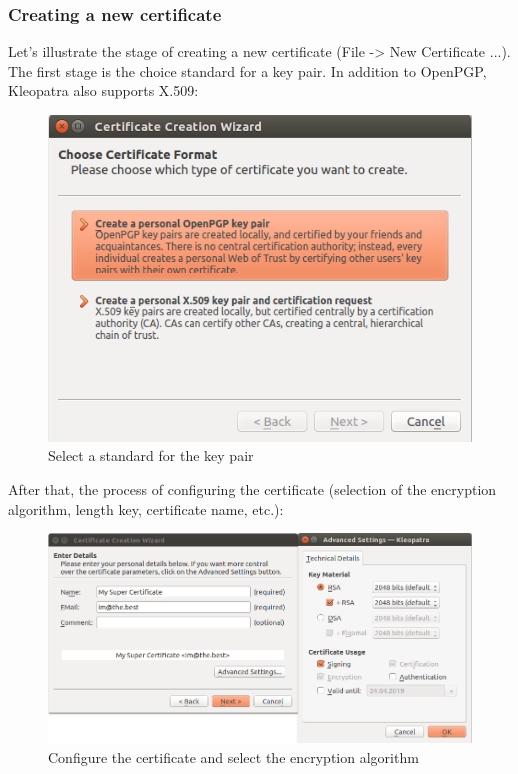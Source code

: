\documentclass[14pt,a4paper,report]{report}
\begin{document}
\subsubsection{Creating a new certificate}

Let's illustrate the stage of creating a new certificate (File -> New Certificate ...). The first stage is the choice standard for a key pair. In addition to OpenPGP, Kleopatra also supports X.509:

\begin{figure}[h!]
	\centering
	\includegraphics[scale = 0.65]{images/1_1.png}
	\caption{Select a standard for the key pair}
\end{figure}

After that, the process of configuring the certificate (selection of the encryption algorithm, length key, certificate name, etc.):

\begin{figure}[h!]
	\centering
	\includegraphics[scale = 0.65]{images/1_2.png}
	\caption{Configure the certificate and select the encryption algorithm}
\end{figure}
\end{document}
